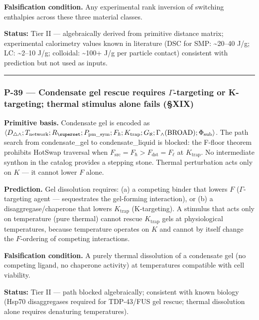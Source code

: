 \documentclass[12pt,a4paper]{article}
\begin{document}
\textbf{Falsification condition.} Any experimental rank inversion of switching enthalpies across these three material classes.

\textbf{Status:} Tier II --- algebraically derived from primitive distance matrix; experimental calorimetry values known in literature (DSC for SMP: \textasciitilde{}20--40 J/g; LC: \textasciitilde{}2--10 J/g; colloidal: \textasciitilde{}100+ J/g per particle contact) consistent with prediction but not used as inputs.

\begin{center}
\rule{0.5\textwidth}{0.4pt}
\end{center}

\subsubsection{P-39 --- Condensate gel rescue requires $\Gamma$-targeting or K-targeting; thermal stimulus alone fails (§XIX)}

\textbf{Primitive basis.} Condensate gel is encoded as $\langle D_{\triangle\wedge}; T_\text{network}; R_\superset; P_{\text{pm\_sym}}; F_\hbar; K_\text{trap}; G_\aleph; \Gamma_\wedge(\text{BROAD}); \Phi_{\text{sub}} \rangle$. The path search from condensate\_gel to condensate\_liquid is blocked: the F-floor theorem prohibits HotSwap traversal when $F_{\text{src}} = F_\hbar > F_{\text{dst}} = F_\ell$ at $K_\text{trap}$. No intermediate synthon in the catalog provides a stepping stone. Thermal perturbation acts only on $K$ --- it cannot lower $F$ alone.

\textbf{Prediction.} Gel dissolution requires: (a) a competing binder that lowers $F$ ($\Gamma$-targeting agent --- sequestrates the gel-forming interaction), or (b) a disaggregase/chaperone that lowers $K_\text{trap}$ (K-targeting). A stimulus that acts only on temperature (pure thermal) cannot rescue $K_\text{trap}$ gels at physiological temperatures, because temperature operates on $K$ and cannot by itself change the $F$-ordering of competing interactions.

\textbf{Falsification condition.} A purely thermal dissolution of a condensate gel (no competing ligand, no chaperone activity) at temperatures compatible with cell viability.

\textbf{Status:} Tier II --- path blocked algebraically; consistent with known biology (Hsp70 disaggregases required for TDP-43/FUS gel rescue; thermal dissolution alone requires denaturing temperatures).
\end{document}
